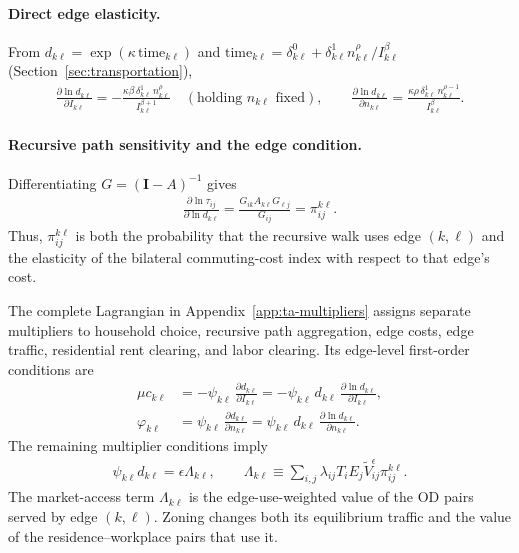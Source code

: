 \documentclass[12pt, a4paper]{article}
\theoremstyle{definition}
\theoremstyle{remark}
\begin{document}
\paragraph{Direct edge elasticity.} From $d_{k\ell}=\exp(\kappa\,\mathrm{time}_{k\ell})$ and $\mathrm{time}_{k\ell}=\delta_{k\ell}^0+\delta_{k\ell}^1 n_{k\ell}^\rho/I_{k\ell}^\beta$ (Section~\ref{sec:transportation}),
\begin{align}
    \label{eq:d-elasticity}
    \frac{\partial \ln d_{k\ell}}{\partial I_{k\ell}} = -\frac{\kappa\beta\,\delta_{k\ell}^1\,n_{k\ell}^\rho}{I_{k\ell}^{\beta+1}}\quad(\text{holding }n_{k\ell}\text{ fixed}), \qquad
    \frac{\partial \ln d_{k\ell}}{\partial n_{k\ell}} = \frac{\kappa\rho\,\delta_{k\ell}^1\,n_{k\ell}^{\rho-1}}{I_{k\ell}^\beta}.
\end{align}

\paragraph{Recursive path sensitivity and the edge condition.}
Differentiating $G=(\mathbf I-A)^{-1}$ gives
\begin{align}
    \label{eq:recursive-path-derivative}
    \frac{\partial\ln\tau_{ij}}{\partial\ln d_{k\ell}}
    =
    \frac{G_{ik}A_{k\ell}G_{\ell j}}{G_{ij}}
    =
    \pi_{ij}^{k\ell}.
\end{align}
Thus, $\pi_{ij}^{k\ell}$ is both the probability that the recursive walk uses edge $(k,\ell)$ and the elasticity of the bilateral commuting-cost index with respect to that edge's cost.

The complete Lagrangian in Appendix~\ref{app:ta-multipliers} assigns separate multipliers to household choice, recursive path aggregation, edge costs, edge traffic, residential rent clearing, and labor clearing. Its edge-level first-order conditions are
\begin{align}
    \label{eq:I-foc-lagrangian}
\mu c_{k\ell} &= -\psi_{k\ell}\,\frac{\partial d_{k\ell}}{\partial I_{k\ell}} = -\psi_{k\ell}\,d_{k\ell}\,\frac{\partial \ln d_{k\ell}}{\partial I_{k\ell}}, \\
    \label{eq:phi-kl}
\varphi_{k\ell} &= \psi_{k\ell}\,\frac{\partial d_{k\ell}}{\partial n_{k\ell}} = \psi_{k\ell}\,d_{k\ell}\,\frac{\partial \ln d_{k\ell}}{\partial n_{k\ell}}.
\end{align}
The remaining multiplier conditions imply
\begin{align}
    \label{eq:edge-market-access}
    \psi_{k\ell}d_{k\ell}
    =
    \epsilon\Lambda_{k\ell},
    \qquad
    \Lambda_{k\ell}
    \equiv
    \sum_{i,j}
    \lambda_{ij}T_iE_j\tilde V_{ij}^{\epsilon}
    \pi_{ij}^{k\ell}.
\end{align}
The market-access term $\Lambda_{k\ell}$ is the edge-use-weighted value of the OD pairs served by edge $(k,\ell)$. Zoning changes both its equilibrium traffic and the value of the residence--workplace pairs that use it.
\end{document}
